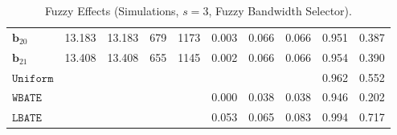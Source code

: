 \documentclass[10pt]{article}
\newcommand{\bb}{\mathbf{b}}
\begin{document}
\begin{table}[p]
\begin{tabular}{lccccrrrrr}
$\bb_{20}$ & 13.183 & 13.183 & 679 & 1173 & 0.003 & 0.066 & 0.066 & 0.951 & 0.387 \\
$\bb_{21}$ & 13.408 & 13.408 & 655 & 1145 & 0.002 & 0.066 & 0.066 & 0.954 & 0.390 \\
\midrule
$\mathtt{Uniform}$ &  &  &  &  &  &  &  & 0.962 & 0.552 \\
\midrule
$\mathtt{WBATE}$ &  &  &  &  & 0.000 & 0.038 & 0.038 & 0.946 & 0.202 \\
\midrule
$\mathtt{LBATE}$ &  &  &  &  & 0.053 & 0.065 & 0.083 & 0.994 & 0.717 \\
\bottomrule\bottomrule
\end{tabular}

    \caption{Fuzzy Effects (Simulations, $s=3$, Fuzzy Bandwidth Selector).}
    \label{tab:sa-simuls-fuzzy-s3-bwmain}
\end{table}

\clearpage


\clearpage


\end{document}
